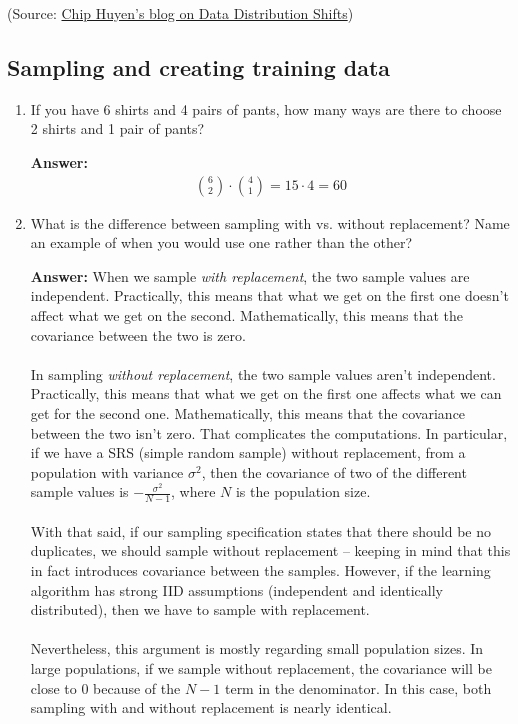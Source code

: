 \documentclass{article}
\newenvironment{QandA}{\begin{enumerate}[label=\arabic*.]}{\end{enumerate}}
\newenvironment{InnerQandA}{\begin{enumerate}[label=\roman*.]}{\end{enumerate}}
\newenvironment{answer}{\par\normalfont \textbf{Answer:}}{}
\begin{document}
\begin{QandA}
\begin{InnerQandA}
    (Source: \href{https://huyenchip.com/2022/02/07/data-distribution-shifts-and-monitoring.html}{Chip Huyen's blog on Data Distribution Shifts})
    \end{InnerQandA}
\end{QandA}

\subsection{Sampling and creating training data}
\begin{QandA}
    \item If you have 6 shirts and 4 pairs of pants, how many ways are there to choose 2 shirts and 1 pair of pants?
    \begin{answer}
        \begin{align*}
            {6 \choose 2} \cdot {4 \choose 1} = 15 \cdot 4 = 60
        \end{align*}
    \end{answer}

    \item What is the difference between sampling with vs. without replacement? Name an example of when you would use one rather than the other?
    \begin{answer}
        When we sample \textit{with replacement}, the two sample values are independent. Practically, this means that what we get on the first one doesn't affect what we get on the second. Mathematically, this means that the covariance between the two is zero. \\\\
        In sampling \textit{without replacement}, the two sample values aren't independent. Practically, this means that what we get on the first one affects what we can get for the second one. Mathematically, this means that the covariance between the two isn't zero. That complicates the computations. In particular, if we have a SRS (simple random sample) without replacement, from a population with variance $\sigma^2$, then the covariance of two of the different sample values is $-\frac{\sigma^2}{N-1}$, where $N$ is the population size. \\\\
        With that said, if our sampling specification states that there should be no duplicates, we should sample without replacement -- keeping in mind that this in fact introduces covariance between the samples. However, if the learning algorithm has strong IID assumptions (independent and identically distributed), then we have to sample with replacement. \\\\
        Nevertheless, this argument is mostly regarding small population sizes. In large populations, if we sample without replacement, the covariance will be close to $0$ because of the $N-1$ term in the denominator. In this case, both sampling with and without replacement is nearly identical. 


\end{answer}
\end{QandA}
\end{document}
